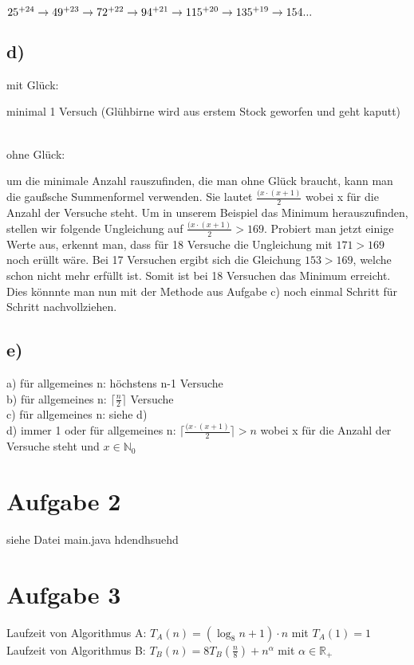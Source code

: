 \documentclass[a4paper]{scrartcl}
\begin{document}
$25 \textsuperscript{+24}\rightarrow 49 \textsuperscript{+23}\rightarrow 72 \textsuperscript{+22}\rightarrow 94 \textsuperscript{+21}\rightarrow 115 \textsuperscript{+20}\rightarrow 135 \textsuperscript{+19}\rightarrow 154... $ 
\subsection*{d)}
\begin{bfseries} mit Glück: \end{bfseries} minimal 1 Versuch (Glühbirne wird aus erstem Stock geworfen und geht kaputt)
\\
\\
\begin{bfseries} ohne Glück:\end{bfseries} um die minimale Anzahl rauszufinden, die man ohne Glück braucht, kann man die gaußsche Summenformel verwenden. Sie lautet $\frac{(x \cdot (x+1)}{2}$ wobei x für die Anzahl der Versuche steht. Um in unserem Beispiel das Minimum herauszufinden, stellen wir folgende Ungleichung auf $\frac{(x \cdot (x+1)}{2} > 169$. Probiert man jetzt einige Werte aus, erkennt man, dass für 18 Versuche die Ungleichung mit $171 > 169$ noch erüllt wäre. Bei 17 Versuchen ergibt sich die Gleichung $ 153 > 169$, welche schon nicht mehr erfüllt ist. Somit ist bei 18 Versuchen das Minimum erreicht. Dies könnnte man nun mit der Methode aus Aufgabe c) noch einmal Schritt für Schritt nachvollziehen.
\subsection*{e)}
a) für allgemeines n: höchstens n-1 Versuche
\\
b) für allgemeines n: $ \lceil \frac{n}{2} \rceil$ Versuche
\\
c) für allgemeines n: siehe d)
\\
d) immer 1 oder für allgemeines n:  $\lceil \frac{(x \cdot (x+1)}{2}\rceil > n$ wobei x für die Anzahl der Versuche steht und $x \in \mathbb{N}_0$

\section*{Aufgabe 2}
siehe Datei main.java
hdendhsuehd

\section*{Aufgabe 3}
Laufzeit von Algorithmus A: $T_A(n)=(\log_{8}n+1)\cdot n$ mit $T_A(1)=1$\\
Laufzeit von Algorithmus B: $T_B(n)=8T_B(\frac{n}{8})+n^{\alpha}$ mit $\alpha \in \mathbb{R}_+$
\end{document}
